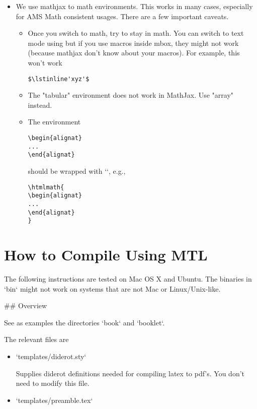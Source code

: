 \begin{example}
\begin{noten}
\begin{important}
\begin{definition}[Group]
\begin{itemize}
\item We use mathjax to math environments.  This works in many cases, especially for AMS Math consistent usages.  There are a few important caveats. 

\begin{itemize}
\item Once you switch to math, try to stay in math.  You can switch to text mode using \mbox{} but if you use macros inside mbox, they might not work (because mathjax don't know about your macros).  For example, this won't work 
\begin{lstlisting}
$\lstinline'xyz'$
\end{lstlisting}

\item The "tabular" environment does not work in MathJax.  Use "array" instead.

\item  The environment 
\begin{lstlisting}
\begin{alignat} 
... 
\end{alignat}
\end{lstlisting}
%
should be wrapped with `\htmlmath`, e.g.,
%
\begin{lstlisting}
\htmlmath{
\begin{alignat} 
... 
\end{alignat}
}
\end{lstlisting} 
\end{itemize}
\end{itemize}
  

\section{How to Compile Using MTL}

The following instructions are tested on Mac OS X and Ubuntu.  The binaries in `bin` might not work on systems that are not Mac or Linux/Unix-like. 

## Overview

See as examples the directories `book` and `booklet`.

The relevant files are 
\begin{itemize}
\item `templates/diderot.sty`

   Supplies diderot definitions needed for compiling latex to pdf's.
   You don't need to modify this file.

\item `templates/preamble.tex` 


\end{itemize}
\end{definition}
\end{important}
\end{noten}
\end{example}
